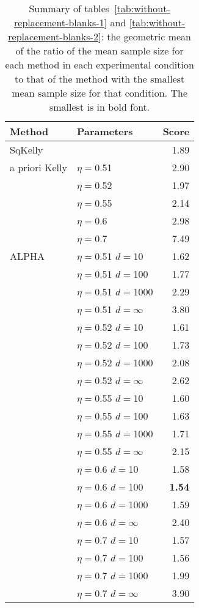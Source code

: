 \documentclass[12pt,runningheads]{llncs}
\begin{document}
{\begin{table}
\centering
\tiny
\begin{tabular}{llr}\\ 
Method & Parameters & Score \\
\hline SqKelly & & 1.89 \\ 
 \hline a priori Kelly 
 & $\eta=$0.51 & 2.90 \\
 & $\eta=$0.52 & 1.97 \\
 & $\eta=$0.55 & 2.14 \\
 & $\eta=$0.6 & 2.98 \\
 & $\eta=$0.7 & 7.49 \\
\hline ALPHA 
 & $\eta=$0.51 $d=$10 & 1.62 \\ 
 & $\eta=$0.51 $d=$100 & 1.77 \\ 
 & $\eta=$0.51 $d=$1000 & 2.29 \\ 
 & $\eta=$0.51 $d=\infty$ & 3.80 \\
\cline{2-3}
 & $\eta=$0.52 $d=$10 & 1.61 \\ 
 & $\eta=$0.52 $d=$100 & 1.73 \\ 
 & $\eta=$0.52 $d=$1000 & 2.08 \\ 
 & $\eta=$0.52 $d=\infty$ & 2.62 \\
\cline{2-3}
 & $\eta=$0.55 $d=$10 & 1.60 \\ 
 & $\eta=$0.55 $d=$100 & 1.63 \\ 
 & $\eta=$0.55 $d=$1000 & 1.71 \\ 
 & $\eta=$0.55 $d=\infty$ & 2.15 \\
\cline{2-3}
 & $\eta=$0.6 $d=$10 & 1.58 \\ 
 & $\eta=$0.6 $d=$100 & \bf{1.54} \\ 
 & $\eta=$0.6 $d=$1000 & 1.59 \\ 
 & $\eta=$0.6 $d=\infty$ & 2.40 \\
\cline{2-3}
 & $\eta=$0.7 $d=$10 & 1.57 \\ 
 & $\eta=$0.7 $d=$100 & 1.56 \\ 
 & $\eta=$0.7 $d=$1000 & 1.99 \\ 
 & $\eta=$0.7 $d=\infty$ & 3.90 \\
\end{tabular}
\caption{\protect \label{tab:summary}
Summary of tables~\ref{tab:without-replacement-blanks-1} and \ref{tab:without-replacement-blanks-2}:
the geometric mean of the ratio of the mean sample size for each method in each experimental condition to
that of the method with the smallest mean sample size for that condition.
The smallest is in bold font.
}
\end{table}

}
\end{document}
